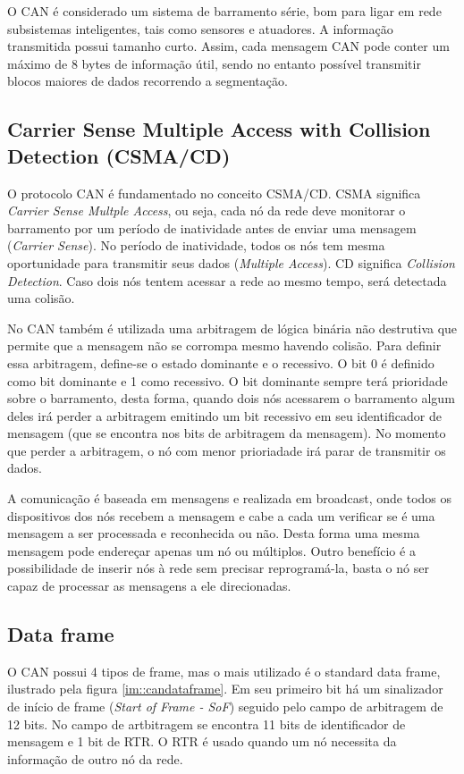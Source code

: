 O CAN é considerado um sistema de barramento série, bom para ligar em rede subsistemas inteligentes, tais como sensores e atuadores. A informação transmitida possui tamanho curto. Assim, cada mensagem CAN pode conter um máximo de 8 bytes de informação útil, sendo no entanto possível transmitir blocos maiores de dados recorrendo a segmentação.

\subsection{Carrier Sense Multiple Access with Collision Detection (CSMA/CD)}

O protocolo CAN é fundamentado no conceito CSMA/CD. CSMA significa {\it Carrier Sense Multple Access}, ou seja, cada nó da rede deve monitorar o barramento por um período de inatividade antes de enviar uma mensagem ({\it Carrier Sense}). No período de inatividade, todos os nós tem mesma oportunidade para transmitir seus dados ({\it Multiple Access}). CD significa {\it Collision Detection}. Caso dois nós tentem acessar a rede ao mesmo tempo, será detectada uma colisão. 

No CAN também é utilizada uma arbitragem de lógica binária não destrutiva que permite que a mensagem não se corrompa mesmo havendo colisão. Para definir essa arbitragem, define-se o estado dominante e o recessivo. O bit 0 é definido como bit dominante e 1 como recessivo. O bit dominante sempre terá prioridade sobre o barramento, desta forma, quando dois nós acessarem o barramento algum deles irá perder a arbitragem emitindo um bit recessivo em seu identificador de mensagem (que se encontra nos bits de arbitragem da mensagem). No momento que perder a arbitragem, o nó com menor prioriadade irá parar de transmitir os dados.

A comunicação é baseada em mensagens e realizada em broadcast, onde todos os dispositivos dos nós recebem a mensagem e cabe a cada um verificar se é uma mensagem a ser processada e reconhecida ou não. Desta forma uma mesma mensagem pode endereçar apenas um nó ou múltiplos. Outro benefício é a possibilidade de inserir nós à rede sem precisar reprogramá-la, basta o nó ser capaz de processar as mensagens a ele direcionadas.

\subsection{Data frame}

O CAN possui 4 tipos de frame, mas o mais utilizado é o standard data frame, ilustrado pela figura \ref{im::candataframe}. Em seu primeiro bit há um sinalizador de início de frame ({\it Start of Frame - SoF}) seguido pelo campo de arbitragem de 12 bits. No campo de artbitragem se encontra 11 bits de identificador de mensagem e 1 bit de RTR. O RTR é usado quando um nó necessita da informação de outro nó da rede. 

